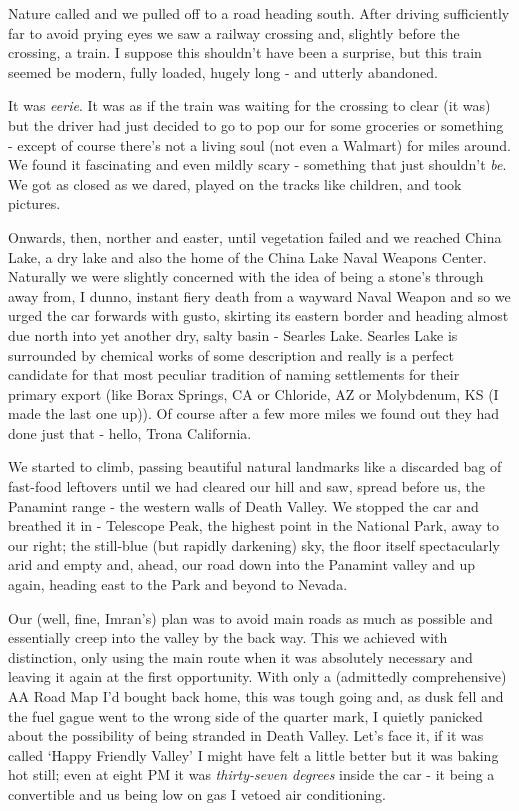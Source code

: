 \documentclass[a5paper,10pt,titlepage,draft]{book}
\begin{document}
Nature called and we pulled off to a road heading south.  After driving sufficiently far to avoid prying eyes we saw a railway crossing and, slightly before the crossing, a train. I suppose this shouldn't have been a surprise, but this train seemed be modern, fully loaded, hugely long - and utterly abandoned.

It was \emph{eerie}.  It was as if the train was waiting for the crossing to clear (it was) but the driver had just decided to go to pop our for some groceries or something - except of course there's not a living soul (not even a Walmart) for miles around.  We found it fascinating and even mildly scary - something that just shouldn't \emph{be}.  We got as closed as we dared, played on the tracks like children, and took pictures.

Onwards, then, norther and easter, until vegetation failed and we reached China Lake, a dry lake and also the home of the China Lake Naval Weapons Center.  Naturally we were slightly concerned with the idea of being a stone's through away from, I dunno, instant fiery death from a wayward Naval Weapon and so we urged the car forwards with gusto, skirting its eastern border and heading almost due north into yet another dry, salty basin - Searles Lake.  Searles Lake is surrounded by chemical works of some description and really is a perfect candidate for that most peculiar tradition of naming settlements for their primary export (like Borax Springs, CA or Chloride, AZ or Molybdenum, KS (I made the last one up)).  Of course after a few more miles we found out they had done just that - hello, Trona California.

We started to climb, passing beautiful natural landmarks like a discarded bag of fast-food leftovers until we had cleared our hill and saw, spread before us, the Panamint range - the western walls of Death Valley.  We stopped the car and breathed it in - Telescope Peak, the highest point in the National Park, away to our right; the still-blue (but rapidly darkening) sky, the floor itself spectacularly arid and empty and, ahead, our road down into the Panamint valley and up again, heading east to the Park and beyond to Nevada.

Our (well, fine, Imran's) plan was to avoid main roads as much as possible and essentially creep into the valley by the back way.  This we achieved with distinction, only using the main route when it was absolutely necessary and leaving it again at the first opportunity.  With only a (admittedly comprehensive) AA Road Map I'd bought back home, this was tough going and, as dusk fell and the fuel gague went to the wrong side of the quarter mark, I quietly panicked about the possibility of being stranded in Death Valley.  Let's face it, if it was called `Happy Friendly Valley' I might have felt a little better but it was baking hot still; even at eight PM it was \emph{thirty-seven degrees} inside the car - it being a convertible and us being low on gas I vetoed air conditioning.
\end{document}
